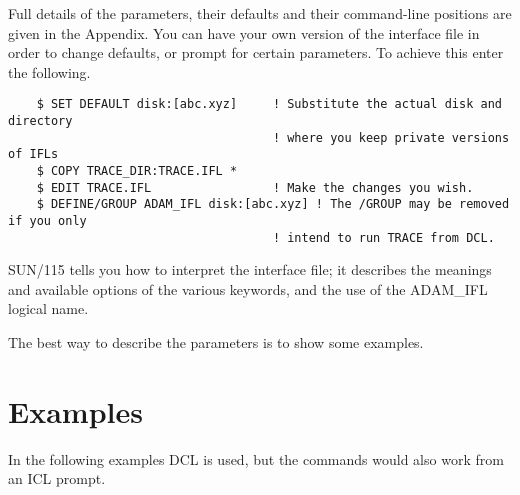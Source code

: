Full details of the parameters, their defaults and their command-line
positions are given in the Appendix. You can have your own version of
the interface file in order to change defaults, or prompt for certain
parameters. To achieve this enter the following.
\small
\begin{verbatim}
    $ SET DEFAULT disk:[abc.xyz]     ! Substitute the actual disk and directory
                                     ! where you keep private versions of IFLs
    $ COPY TRACE_DIR:TRACE.IFL *
    $ EDIT TRACE.IFL                 ! Make the changes you wish.
    $ DEFINE/GROUP ADAM_IFL disk:[abc.xyz] ! The /GROUP may be removed if you only
                                     ! intend to run TRACE from DCL.
\end{verbatim}
\normalsize
SUN/115 tells you how to interpret the interface file; it describes
the meanings and available options of the various keywords, and the
use of the ADAM\_IFL logical name.

The best way to describe the parameters is to show some examples.

\section{Examples}
\label{se:example}
In the following examples DCL is used, but the commands would also work
from an ICL prompt.
